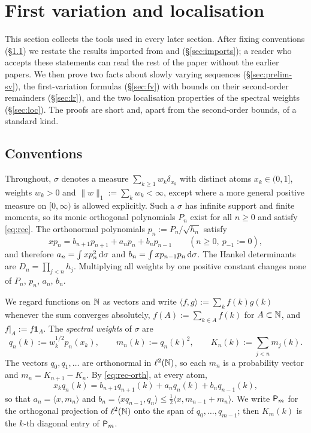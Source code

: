 \section{First variation and localisation}\label{sec:prelim}

This section collects the tools used in every later section. After fixing conventions (\S\ref{sec:conv}) we restate
the results imported from \cite{PaperI} and \cite{PaperII} (\S\ref{sec:imports}); a reader who accepts these
statements can read the rest of the paper without the earlier papers. We then prove two facts about slowly varying
sequences (\S\ref{sec:prelim-sv}), the first-variation formulas (\S\ref{sec:fv}) with bounds on their second-order
remainders (\S\ref{sec:lr}), and the two localisation properties of the spectral weights (\S\ref{sec:loc}). The proofs
are short and, apart from the second-order bounds, of a standard kind.

\subsection{Conventions}\label{sec:conv}
Throughout, $\sigma$ denotes a measure $\sum_{k\ge1}w_k\delta_{x_k}$ with distinct atoms $x_k\in(0,1]$, weights $w_k>0$ and
$\|w\|_1:=\sum_kw_k<\infty$, except where a more general positive measure on $[0,\infty)$ is allowed explicitly. Such
a $\sigma$ has infinite support and finite moments, so its monic orthogonal polynomials $P_n$ exist for all $n\ge0$
and satisfy \eqref{eq:rec}. The orthonormal polynomials $p_n:=P_n/\sqrt{h_n}$ satisfy
\begin{equation}\label{eq:rec-orth}
  xp_n=b_{n+1}p_{n+1}+a_np_n+b_np_{n-1}\qquad(n\ge0,\ p_{-1}:=0),
\end{equation}
and therefore $a_n=\int xp_n^2\,\mathrm{d}\sigma$ and $b_n=\int xp_{n-1}p_n\,\mathrm{d}\sigma$. The Hankel determinants are
$D_n=\prod_{j<n}h_j$. Multiplying all weights by one positive constant changes none of $P_n$, $p_n$, $a_n$, $b_n$.

We regard functions on $\mathbb{N}$ as vectors and write $\langle f,g\rangle:=\sum_kf(k)g(k)$ whenever the sum converges
absolutely, $f(A):=\sum_{k\in A}f(k)$ for $A\subset\mathbb{N}$, and $f|_A:=f\mathbf 1_A$. The \emph{spectral weights} of
$\sigma$ are
\begin{equation}\label{eq:spectral}
  q_n(k):=w_k^{1/2}p_n(x_k),\qquad m_n(k):=q_n(k)^2,\qquad K_n(k):=\sum_{j<n}m_j(k).
\end{equation}
The vectors $q_0,q_1,\dots$ are orthonormal in $\ell^2(\mathbb{N})$, so each $m_n$ is a probability vector and
$m_n=K_{n+1}-K_n$. By \eqref{eq:rec-orth}, at every atom,
\begin{equation}\label{eq:rec-vec}
  x_kq_n(k)=b_{n+1}q_{n+1}(k)+a_nq_n(k)+b_nq_{n-1}(k),
\end{equation}
so that $a_n=\langle x,m_n\rangle$ and $b_n=\langle xq_{n-1},q_n\rangle\le\frac12\langle x,m_{n-1}+m_n\rangle$. We write
$\mathsf{P}_m$ for the orthogonal projection of $\ell^2(\mathbb{N})$ onto the span of $q_0,\dots,q_{m-1}$; then $K_m(k)$ is the
$k$-th diagonal entry of $\mathsf{P}_m$.

